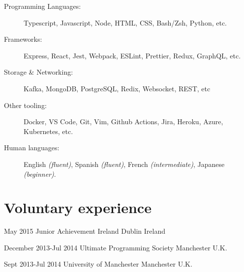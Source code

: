 \documentclass[10pt]{CurriculumVitae}
\begin{document}
    \begin{description}
      \item[Programming Languages:] Typescript, Javascript, Node, HTML, CSS, Bash/Zsh, Python, etc.
      \item[Frameworks:] Express, React, Jest, Webpack, ESLint, Prettier, Redux, GraphQL, etc.
      \item[Storage \& Networking:] Kafka, MongoDB, PostgreSQL, Redix, Websocket, REST, etc
      \item[Other tooling:] Docker, VS Code, Git, Vim, Github Actions, Jira, Heroku, Azure, Kubernetes, etc.
      \item[Human languages:] English \emph{(fluent)}, Spanish \emph{(fluent)}, French \emph{(intermediate)}, Japanese \emph{(beginner)}.
    \end{description}


  \section{Voluntary experience}
     
      {May 2015}
      {Junior Achievement Ireland}
      {Dublin}
      {Ireland}
      {
      }

      {December 2013-Jul 2014}
      {Ultimate Programming Society}
      {Manchester}
      {U.K.}
      {
      }

      {Sept 2013-Jul 2014}
      {University of Manchester}
      {Manchester}
      {U.K.}
      {
      }
\end{document}
